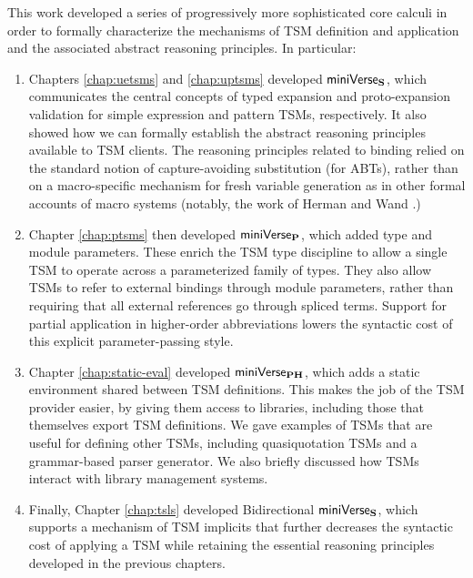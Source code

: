 This work developed a series of progressively more sophisticated core calculi in order to formally characterize the mechanisms of TSM definition and application and the associated abstract reasoning principles. In particular:
\begin{enumerate}
\item Chapters \ref{chap:uetsms} and \ref{chap:uptsms} developed $\mathsf{miniVerse}_\textbf{S}$, which communicates the central concepts of typed expansion and proto-expansion validation for simple expression and pattern TSMs, respectively. It also showed how we can formally establish the abstract reasoning principles available to TSM clients. The reasoning principles related to binding relied on the standard notion of capture-avoiding substitution (for ABTs), rather than on a macro-specific mechanism for fresh variable generation as in other formal accounts of macro systems (notably, the work of Herman and Wand \cite{Herman10:Theory,DBLP:conf/esop/HermanW08}.) 

\item Chapter \ref{chap:ptsms} then developed $\mathsf{miniVerse}_\textbf{P}$, which added type and module parameters. These enrich the TSM type discipline to allow a single TSM to operate across a parameterized family of types. They also allow TSMs to refer to external bindings through module parameters, rather than requiring that all external references go through spliced terms. Support for partial application in higher-order abbreviations lowers the syntactic cost of this explicit parameter-passing style. 

\item Chapter \ref{chap:static-eval} developed $\mathsf{miniVerse}_\textbf{PH}$, which adds a static environment shared between TSM definitions. This makes the job of the TSM provider easier, by giving them access to libraries, including those that themselves export TSM definitions. We gave examples of TSMs that are useful for defining other TSMs, including quasiquotation TSMs and a grammar-based parser generator. We also briefly discussed how TSMs interact with library management systems.

\item Finally, Chapter \ref{chap:tsls} developed Bidirectional $\mathsf{miniVerse}_\textbf{S}$, which supports a mechanism of TSM implicits that further decreases the syntactic cost of applying a TSM while retaining the essential reasoning principles developed in the previous chapters.
\end{enumerate}

\vspace{-10px}
